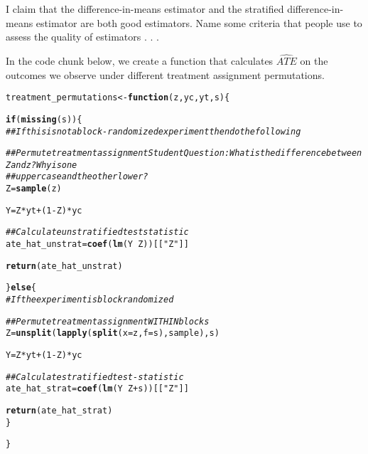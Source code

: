 \documentclass[11pt,leqno]{article}\usepackage[]{graphicx}\usepackage[]{color}
\makeatletter
\newcommand{\hlnum}[1]{\textcolor[rgb]{0.686,0.059,0.569}{#1}}%
\newcommand{\hlstr}[1]{\textcolor[rgb]{0.192,0.494,0.8}{#1}}%
\newcommand{\hlcom}[1]{\textcolor[rgb]{0.678,0.584,0.686}{\textit{#1}}}%
\newcommand{\hlopt}[1]{\textcolor[rgb]{0,0,0}{#1}}%
\newcommand{\hlstd}[1]{\textcolor[rgb]{0.345,0.345,0.345}{#1}}%
\newcommand{\hlkwa}[1]{\textcolor[rgb]{0.161,0.373,0.58}{\textbf{#1}}}%
\newcommand{\hlkwb}[1]{\textcolor[rgb]{0.69,0.353,0.396}{#1}}%
\newcommand{\hlkwc}[1]{\textcolor[rgb]{0.333,0.667,0.333}{#1}}%
\newcommand{\hlkwd}[1]{\textcolor[rgb]{0.737,0.353,0.396}{\textbf{#1}}}%
\newenvironment{kframe}{%
 \def\at@end@of@kframe{}%
 \ifinner\ifhmode%
  \def\at@end@of@kframe{\end{minipage}}%
  \begin{minipage}{\columnwidth}%
 \fi\fi%
 \def\FrameCommand##1{\hskip\@totalleftmargin \hskip-\fboxsep
 \colorbox{shadecolor}{##1}\hskip-\fboxsep
     \hskip-\linewidth \hskip-\@totalleftmargin \hskip\columnwidth}%
 \MakeFramed {\advance\hsize-\width
   \@totalleftmargin\z@ \linewidth\hsize
   \@setminipage}}%
 {\par\unskip\endMakeFramed%
 \at@end@of@kframe}
\newenvironment{knitrout}{}{} %
\theoremstyle{newstyle}
\makeatother
\begin{document}
I claim that the difference-in-means estimator and the stratified difference-in-means estimator are both good estimators. Name some criteria that people use to assess the quality of estimators . . .

In the code chunk below, we create a function that calculates $\widehat{ATE}$ on the outcomes we observe under different treatment assignment permutations.

\begin{knitrout}\footnotesize
{}\color{fgcolor}\begin{kframe}
\begin{alltt}
\hlstd{treatment_permutations} \hlkwb{<-} \hlkwa{function}\hlstd{(}\hlkwc{z}\hlstd{,} \hlkwc{yc}\hlstd{,} \hlkwc{yt}\hlstd{,} \hlkwc{s}\hlstd{) \{}

    \hlkwa{if} \hlstd{(}\hlkwd{missing}\hlstd{(s)) \{}
        \hlcom{## If this is not a block-randomized experiment then do the following}

        \hlcom{## Permute treatment assignment Student Question: What is the difference between Z and z?  Why is one}
        \hlcom{## uppercase and the other lower?}
        \hlstd{Z} \hlkwb{=} \hlkwd{sample}\hlstd{(z)}

        \hlstd{Y} \hlkwb{=} \hlstd{Z} \hlopt{*} \hlstd{yt} \hlopt{+} \hlstd{(}\hlnum{1} \hlopt{-} \hlstd{Z)} \hlopt{*} \hlstd{yc}

        \hlcom{## Calculate unstratified test statistic}
        \hlstd{ate_hat_unstrat} \hlkwb{=} \hlkwd{coef}\hlstd{(}\hlkwd{lm}\hlstd{(Y} \hlopt{~} \hlstd{Z))[[}\hlstr{"Z"}\hlstd{]]}

        \hlkwd{return}\hlstd{(ate_hat_unstrat)}

    \hlstd{\}} \hlkwa{else} \hlstd{\{}
        \hlcom{# If the experiment is block randomized}

        \hlcom{## Permute treatment assignment WITHIN blocks}
        \hlstd{Z} \hlkwb{=} \hlkwd{unsplit}\hlstd{(}\hlkwd{lapply}\hlstd{(}\hlkwd{split}\hlstd{(}\hlkwc{x} \hlstd{= z,} \hlkwc{f} \hlstd{= s), sample), s)}

        \hlstd{Y} \hlkwb{=} \hlstd{Z} \hlopt{*} \hlstd{yt} \hlopt{+} \hlstd{(}\hlnum{1} \hlopt{-} \hlstd{Z)} \hlopt{*} \hlstd{yc}

        \hlcom{## Calculate stratified test-statistic}
        \hlstd{ate_hat_strat} \hlkwb{=} \hlkwd{coef}\hlstd{(}\hlkwd{lm}\hlstd{(Y} \hlopt{~} \hlstd{Z} \hlopt{+} \hlstd{s))[[}\hlstr{"Z"}\hlstd{]]}

        \hlkwd{return}\hlstd{(ate_hat_strat)}
    \hlstd{\}}

\hlstd{\}}
\end{alltt}
\end{kframe}
\end{knitrout}
\end{document}
